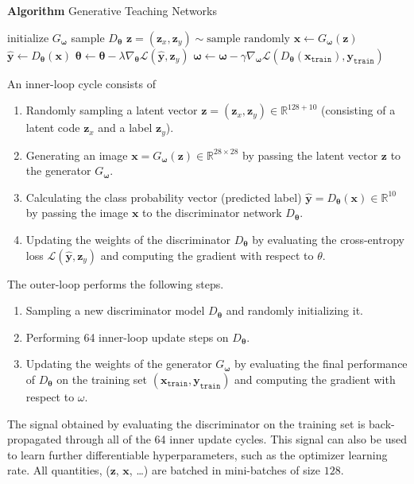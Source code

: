 \documentclass[10pt]{article}
\renewcommand\vec[1]{\boldsymbol{\mathbf {#1}}}
\newcommand\R{\mathbb {R}}
\begin{document}
\begin{algorithm}[H]
\caption*{\textbf{Algorithm} Generative Teaching Networks}
\begin{algorithmic}
\STATE initialize $G_{\vec\omega}$
\STATE sample $D_{\vec\theta}$
    \STATE $\vec z = (\vec z_x, \vec z_y) \sim \text{sample randomly}$
    \STATE $\vec x \gets G_{\vec\omega}(\vec z)$
    \STATE $\hat {\vec y} \gets D_{\vec\theta}(\vec x)$
    \STATE ${\vec\theta} \gets {\vec\theta} - \lambda \nabla_{\vec\theta} \mathcal L(\hat{\vec y}, \vec z_y)$
\ENDFOR
\STATE ${\vec\omega} \gets {\vec\omega} - \gamma \nabla_{\vec\omega} \mathcal L(D_{\vec\theta}(\vec x_{\texttt{train}}), \vec y_{\texttt{train}})$
\ENDFOR
\end{algorithmic}
\end{algorithm}

\noindent
An inner-loop cycle consists of 
\begin{enumerate}
    \item Randomly sampling a latent vector 
          $\vec z = (\vec z_x, \vec z_y) \in \R^{128 + 10}$
          (consisting of a latent code $\vec z_x$ and a label $\vec z_y$).
    \item Generating an image $\vec x = G_{\vec \omega}(\vec z) \in \R^{28\times28}$
          by passing the latent vector $\vec z$ to the generator $G_{\vec \omega}$.
    \item  Calculating the class probability vector (predicted label) $\hat {\vec y} = D_{\vec \theta}(\vec x) \in \R^{10}$
    by passing the image $\vec x$ to the discriminator network $D_{\vec \theta}$.
    \item Updating the weights of the discriminator $D_{\vec \theta}$
    by evaluating the cross-entropy loss $\mathcal L(\hat {\vec y}, \vec z_y)$
    and computing the gradient with respect to $\theta$.
\end{enumerate}
The outer-loop performs the following steps.
\begin{enumerate}
    \item Sampling a new discriminator model $D_{\vec \theta}$ and randomly initializing it.
    \item Performing 64 inner-loop update steps on $D_{\vec \theta}$.
    \item Updating the weights of the generator $G_{\vec \omega}$
    by evaluating the final performance of $D_{\vec \theta}$ 
    on the training set $(\vec x_\texttt{train}, \vec y_\texttt{train})$
    and computing the gradient with respect to $\omega$.
\end{enumerate}
The signal obtained by evaluating the discriminator on the training set is back-propagated 
through all of the 64 inner update cycles.
This signal can also be used to learn further differentiable hyperparameters, 
such as the optimizer learning rate.
All quantities, ($\vec z$, $\vec x$, \ldots) are batched in
mini-batches of size $128$.
\end{document}
